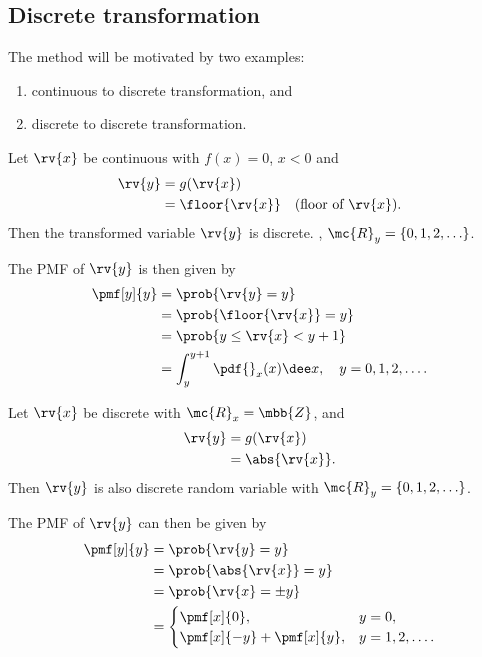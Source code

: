 \subsection{Discrete transformation}
The method will be motivated by two examples:
\begin{enumerate}
    \item continuous to discrete transformation, and
    \item discrete to discrete transformation.
\end{enumerate}
\begin{example}
    Let $\rv{x}$ be continuous with $f(x)=0$, $x<0$ and
    \begin{align}
        \rv{y} &= g(\rv{x})\\
        &= \floor{\rv{x}} \quad \text{(floor of $\rv{x}$)}.
    \end{align}
    Then the transformed variable $\rv{y}$ is discrete. \ie, $\mc{R}_{y}=\left\{ 0,1,2,\ldots\right\}$.
    
    The PMF of $\rv{y}$ is then given by 
    \begin{align}
        \pmf[y]{y}
        &= \prob{\rv{y}=y}\\
        &= \prob{\floor{\rv{x}}=y}\\
        &= \prob{y\leq \rv{x}<y+1}\\
        &= \int_{y}^{y+1}\pdf{}_{x}(x)\dee x, \quad y = 0,1,2,\ldots.
    \end{align}
    \triqed
\end{example}
\begin{example}
    Let $\rv{x}$ be discrete with $\mc{R}_{x}=\mbb{Z}$, and 
    \begin{align}
        \rv{y}
        &= g(\rv{x})\\
        &= \abs{\rv{x}}.
    \end{align}
    Then $\rv{y}$ is also discrete random variable with $\mc{R}_{y}=\left\{ 0,1,2,\ldots\right\}$.

    The PMF of $\rv{y}$ can then be given by
    \begin{align}
        \pmf[y]{y} &= \prob{\rv{y}=y}\\
        &= \prob{\abs{\rv{x}}=y}\\
        &= \prob{\rv{x}=\pm y}\\
        &= 
        \begin{cases}
            \pmf[x]{0}, & y=0,\\
            \pmf[x]{-y}+\pmf[x]{y}, & y=1,2,\ldots.
        \end{cases}
    \end{align}
    \triqed
\end{example}

